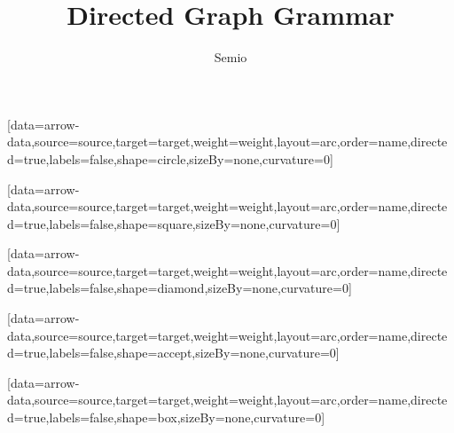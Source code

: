 \documentclass[type=paper,language=en]{semio}
\title{Directed Graph Grammar}
\author{Semio}
\date{}
\begin{document}
\SemioVizProbeOn
\SemioVizProbePage
\begin{VizFigure}[width=80,height=40][data=arrow-data,source=source,target=target,weight=weight,layout=arc,order=name,directed=true,labels=false,shape=circle,sizeBy=none,curvature=0]\end{VizFigure}
\begin{VizFigure}[width=80,height=40][data=arrow-data,source=source,target=target,weight=weight,layout=arc,order=name,directed=true,labels=false,shape=square,sizeBy=none,curvature=0]\end{VizFigure}
\begin{VizFigure}[width=80,height=40][data=arrow-data,source=source,target=target,weight=weight,layout=arc,order=name,directed=true,labels=false,shape=diamond,sizeBy=none,curvature=0]\end{VizFigure}
\begin{VizFigure}[width=80,height=40][data=arrow-data,source=source,target=target,weight=weight,layout=arc,order=name,directed=true,labels=false,shape=accept,sizeBy=none,curvature=0]\end{VizFigure}
\begin{VizFigure}[width=80,height=40][data=arrow-data,source=source,target=target,weight=weight,layout=arc,order=name,directed=true,labels=false,shape=box,sizeBy=none,curvature=0]\end{VizFigure}
\end{document}
